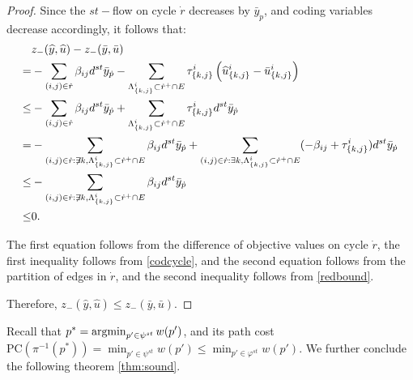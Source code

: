 \begin{proof}
Since the \(st-\)flow on cycle \(\dot{r}\) decreases by \(\bar{y}_{\dot{p}}\), and coding variables decrease accordingly, it follows that:
\begin{equation}
\begin{split}
&z_{-}(\widehat{y}, \widehat{u}) - z_{-}(\bar{y}, \bar{u}) \\
= &  -\sum_{(i,j) \in \dot{r}} \beta_{ij}d^{st}  \bar{y}_{\dot{p}} - \sum_{\Lambda^i_{\{k,j\}} \subset   \dot{r}^+ \cap E} \tau^i_{\{k,j\} }\left(\widehat{u}^i_{\{k,j\}} - \bar{u}^i_{\{k,j\}}\right)\\
\le & - \sum_{(i,j) \in \dot{r}}\beta_{ij}d^{st}\bar{y}_{\dot{p}} +  \sum_{\Lambda^i_{\{k,j\}} \subset   \dot{r}^+ \cap E} \tau^i_{\{k,j\} } d^{st}\bar{y}_{\dot{p}}\\
= &  - \sum_{(i,j) \in \dot{r}: \not \exists k, \Lambda^i_{\{k,j\}} \subset   \dot{r}^+ \cap E }\beta_{ij}d^{st}\bar{y}_{\dot{p}}   + \sum_{(i,j) \in \dot{r}: \exists k, \Lambda^i_{\{k,j\}} \subset   \dot{r}^+ \cap E }(-\beta_{ij}+\tau^i_{\{k,j\} })d^{st}\bar{y}_{\dot{p}} \\
\le &  - \sum_{(i,j) \in \dot{r}: \not \exists k, \Lambda^i_{\{k,j\}} \subset   \dot{r}^+ \cap E }\beta_{ij}d^{st}\bar{y}_{\dot{p}} \\
\le & 0.
\end{split}
\end{equation}

The first equation follows from the difference of objective values on cycle \(\dot{r}\), the first inequality follows from \eqref{codcycle}, and the second equation follows from the partition of edges in \(\dot{r}\), and the second inequality follows from  \eqref{redbound}.

Therefore,  
\(z_{-}(\widehat{y}, \widehat{u}) \le z_{-}(\bar{y}, \bar{u})\).
\end{proof}

Recall that $p^\ast = \operatorname{argmin}_{p' \in \psi^{st} } w(p')$, and its path cost \(\textrm{PC}(\pi ^{-1}(p^{\ast})) = \min_{p' \in \psi^{st}} w(p')\le \min_{p' \in \varphi^{st}} w(p')\). We further conclude the following theorem \ref{thm:sound}.

